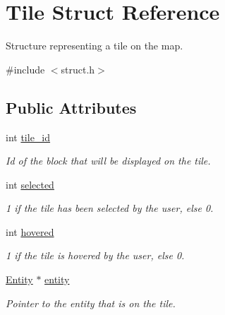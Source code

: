 \hypertarget{struct_tile}{}\section{Tile Struct Reference}
\label{struct_tile}


Structure representing a tile on the map.  




{\ttfamily \#include $<$struct.\+h$>$}

\subsection*{Public Attributes}
\begin{DoxyCompactItemize}
\item 
\mbox{\label{struct_tile_a01d48a66ad0f50abcf70c124d0dfb4bf}} 
int \hyperlink{struct_tile_a01d48a66ad0f50abcf70c124d0dfb4bf}{tile\+\_\+id}
\begin{DoxyCompactList}\small\item\em Id of the block that will be displayed on the tile. \end{DoxyCompactList}\item 
\mbox{\label{struct_tile_ada4b43200e3c80bfff5f38f716187425}} 
int \hyperlink{struct_tile_ada4b43200e3c80bfff5f38f716187425}{selected}
\begin{DoxyCompactList}\small\item\em 1 if the tile has been selected by the user, else 0. \end{DoxyCompactList}\item 
\mbox{\label{struct_tile_ae05a1db94d73450a74dcb7cbaa2bcc10}} 
int \hyperlink{struct_tile_ae05a1db94d73450a74dcb7cbaa2bcc10}{hovered}
\begin{DoxyCompactList}\small\item\em 1 if the tile is hovered by the user, else 0. \end{DoxyCompactList}\item 
\mbox{\label{struct_tile_a0dd60fad81006fc55f4395b699e20736}} 
\hyperlink{struct_8h_a2228f5f8d54732b2077779d47c6f5ffb}{Entity} $\ast$ \hyperlink{struct_tile_a0dd60fad81006fc55f4395b699e20736}{entity}
\begin{DoxyCompactList}\small\item\em Pointer to the entity that is on the tile. \end{DoxyCompactList}\item 

\end{DoxyCompactItemize}
